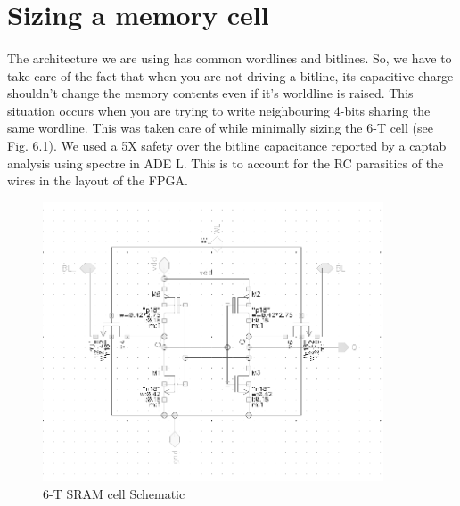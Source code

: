 \section{Sizing a memory cell}
\paragraph{}

The architecture we are using has common wordlines and bitlines. So, we have to take care of the fact that when you are not driving a bitline, its capacitive charge shouldn't change the memory contents even if it's worldline is raised. This situation occurs when you are trying to write neighbouring 4-bits sharing the same wordline. This was taken care of while minimally sizing the 6-T cell (see Fig. 6.1). We used a 5X safety over the bitline capacitance reported by a captab analysis using spectre in ADE L. This is to account for the RC parasitics of the wires in the layout of the FPGA.

\begin{figure}[H]
\centering
\includegraphics[width=0.9\textwidth]{6tcell.png}
\caption{6-T SRAM cell Schematic}
\label{fig:Figure}
\end{figure}

